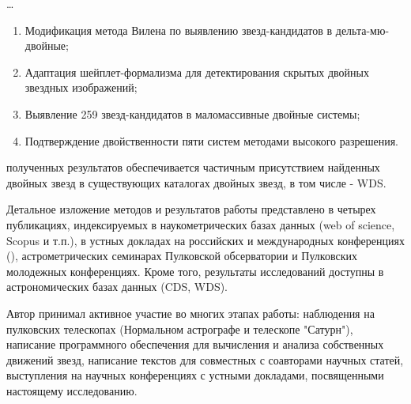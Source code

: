 {\methods} \ldots

{}
\begin{enumerate}
  \item Модификация метода Вилена по выявлению звезд-кандидатов в дельта-мю-двойные;
  \item Адаптация шейплет-формализма для детектирования скрытых двойных звездных изображений;
  \item Выявление 259 звезд-кандидатов в маломассивные двойные системы;
  \item Подтверждение двойственности пяти систем методами высокого разрешения.
\end{enumerate}


{\reliability} полученных результатов обеспечивается частичным присутствием найденных двойных звезд в существующих каталогах двойных звезд, в том числе - WDS.


{\probation}
Детальное изложение методов и результатов работы представлено в четырех публикациях, индексируемых в наукометрических базах данных (web of science, Scopus и т.п.), в устных докладах на российских и международных конференциях (), астрометрических семинарах Пулковской обсерватории и Пулковских молодежных конференциях. Кроме того, результаты исследований доступны в астрономических базах данных (CDS, WDS).

{\contribution} Автор принимал активное участие во многих этапах работы: наблюдения на пулковских  телескопах (Нормальном астрографе и телескопе "Сатурн"), написание программного обеспечения для вычисления и анализа собственных движений звезд, написание текстов для совместных с соавторами научных статей, выступления на научных конференциях с устными докладами, посвященными настоящему исследованию. 

